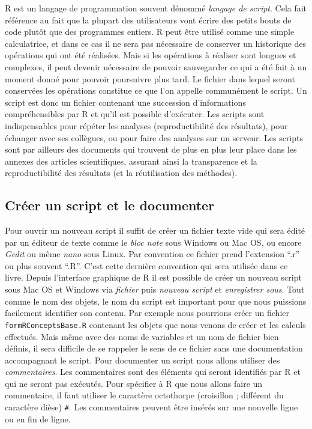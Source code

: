 \documentclass[twoside,symmetric]{book}
\begin{document}
R est un langage de programmation souvent dénommé \emph{langage de script}. Cela fait référence au fait que la plupart des utilisateurs vont écrire des petits bouts de code plutôt que des programmes entiers. R peut être utilisé comme une simple calculatrice, et dans ce cas il ne sera pas nécessaire de conserver un historique des opérations qui ont été réalisées. Mais si les opérations à réaliser sont longues et complexes, il peut devenir nécessaire de pouvoir sauvegarder ce qui a été fait à un moment donné pour pouvoir poursuivre plus tard. Le fichier dans lequel seront conservées les opérations constitue ce que l'on appelle communément le script. Un script est donc un fichier contenant une succession d'informations compréhensibles par R et qu'il est possible d'exécuter. Les scripts sont indispensables pour répéter les analyses (reproductibilité des résultats), pour échanger avec ses collègues, ou pour faire des analyses sur un serveur. Les scripts sont par ailleurs des documents qui trouvent de plus en plus leur place dans les annexes des articles scientifiques, assurant ainsi la transparence et la reproductibilité des résultats (et la réutilisation des méthodes).

\hypertarget{cruxe9er-un-script-et-le-documenter}{%
\subsection{Créer un script et le documenter}\label{cruxe9er-un-script-et-le-documenter}}

Pour ouvrir un nouveau script il suffit de créer un fichier texte vide qui sera édité par un éditeur de texte comme le \emph{bloc note} sous Windows ou Mac OS, ou encore \emph{Gedit} ou même \emph{nano} sous Linux. Par convention ce fichier prend l'extension ``.r'' ou plus souvent ``.R''. C'est cette dernière convention qui sera utilisée dans ce livre. Depuis l'interface graphique de R il est possible de créer un nouveau script sous Mac OS et Windows via \emph{fichier} puis \emph{nouveau script} et \emph{enregistrer sous}.
Tout comme le nom des objets, le nom du script est important pour que nous puissions facilement identifier son contenu. Par exemple nous pourrions créer un fichier \texttt{formRConceptsBase.R} contenant les objets que nous venons de créer et les calculs effectués. Mais même avec des noms de variables et un nom de fichier bien définis, il sera difficile de se rappeler le sens de ce fichier sans une documentation accompagnant le script. Pour documenter un script nous allons utiliser des \emph{commentaires}. Les commentaires sont des éléments qui seront identifiés par R et qui ne seront pas exécutés. Pour spécifier à R que nous allons faire un commentaire, il faut utiliser le caractère octothorpe (croisillon ; différent du caractère dièse) \texttt{\#}. Les commentaires peuvent être insérés sur une nouvelle ligne ou en fin de ligne.
\end{document}
